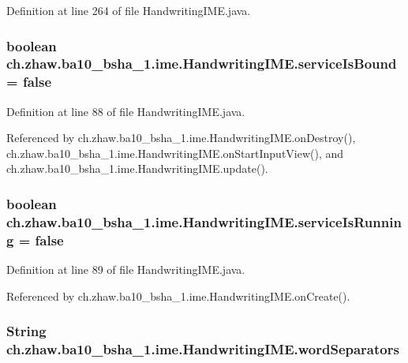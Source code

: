 Definition at line 264 of file HandwritingIME.java.\hypertarget{classch_1_1zhaw_1_1ba10__bsha__1_1_1ime_1_1HandwritingIME_a9d9ecc20c8af30a04dfaa832cd7da89b}{
\subsubsection[{serviceIsBound}]{\setlength{\rightskip}{0pt plus 5cm}boolean {\bf ch.zhaw.ba10\_\-bsha\_\-1.ime.HandwritingIME.serviceIsBound} = false}}
\label{classch_1_1zhaw_1_1ba10__bsha__1_1_1ime_1_1HandwritingIME_a9d9ecc20c8af30a04dfaa832cd7da89b}


Definition at line 88 of file HandwritingIME.java.

Referenced by ch.zhaw.ba10\_\-bsha\_\-1.ime.HandwritingIME.onDestroy(), ch.zhaw.ba10\_\-bsha\_\-1.ime.HandwritingIME.onStartInputView(), and ch.zhaw.ba10\_\-bsha\_\-1.ime.HandwritingIME.update().\hypertarget{classch_1_1zhaw_1_1ba10__bsha__1_1_1ime_1_1HandwritingIME_a2ec39f4494a222882ffb6a09419accd8}{
\subsubsection[{serviceIsRunning}]{\setlength{\rightskip}{0pt plus 5cm}boolean {\bf ch.zhaw.ba10\_\-bsha\_\-1.ime.HandwritingIME.serviceIsRunning} = false}}
\label{classch_1_1zhaw_1_1ba10__bsha__1_1_1ime_1_1HandwritingIME_a2ec39f4494a222882ffb6a09419accd8}


Definition at line 89 of file HandwritingIME.java.

Referenced by ch.zhaw.ba10\_\-bsha\_\-1.ime.HandwritingIME.onCreate().\hypertarget{classch_1_1zhaw_1_1ba10__bsha__1_1_1ime_1_1HandwritingIME_a23ac28ca44ad5920e88c7671b7a9f2d1}{
\subsubsection[{wordSeparators}]{\setlength{\rightskip}{0pt plus 5cm}String {\bf ch.zhaw.ba10\_\-bsha\_\-1.ime.HandwritingIME.wordSeparators}}}
\label{classch_1_1zhaw_1_1ba10__bsha__1_1_1ime_1_1HandwritingIME_a23ac28ca44ad5920e88c7671b7a9f2d1}


